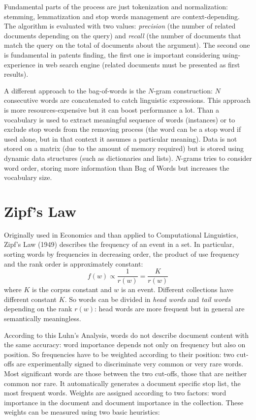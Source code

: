 \documentclass[11pt, a4page]{article}
\begin{document}
Fundamental parts of the process are just tokenization and normalization: stemming, lemmatization and stop words management are context-depending.
The algorithm is evaluated with two values: \textit{precision} (the number of related documents depending on the query) and \textit{recall} (the number of documents that match the query on the total of documents about the argument).
The second one is fundamental in patents finding, the first one is important considering using-experience in web search engine (related documents must be presented as first results). \newline

A different approach to the bag-of-words is the $N$-gram construction: $N$ consecutive words are concatenated to catch linguistic expressions.
This approach is more resources-expensive but it can boost performance a lot.
Than a vocabulary is used to extract meaningful sequence of words (instances) or to exclude stop words from the removing process (the word can be a stop word if used alone, but in that context it assumes a particular meaning).
Data is not stored on a matrix (due to the amount of memory required) but is stored using dynamic data structures (such as dictionaries and lists).
$N$-grams tries to consider word order, storing more information than Bag of Words but increases the vocabulary size.

\section{Zipf's Law}
Originally used in Economics and than applied to Computational Linguistics, Zipf's Law (1949) describes the frequency of an event in a set.
In particular, sorting words by frequencies in decreasing order, the product of use frequency and the rank order is approximately constant:
\begin{equation*}
  f(w) \propto \frac{1}{r(w)} = \frac{K}{r(w)}
\end{equation*}
where $K$ is the corpus constant and $w$ is an event. 
Different collections have different constant $K$. 
So words can be divided in \textit{head words} and \textit{tail words} depending on the rank $r(w)$: head words are more frequent but in general are semantically meaningless.

According to this Luhn's Analysis, words do not describe document content with the same accuracy: word importance depends not only on frequency but also on position.
So frequencies have to be weighted according to their position: two cut-offs are experimentally signed to discriminate very common or very rare words.
Most significant words are those between the two cut-offs, those that are neither common nor rare.
It automatically generates a document specific stop list, the most frequent words.
Weights are assigned according to two factors: word importance in the document and document importance in the collection.
These weights can be measured using two basic heuristics:
\end{document}
